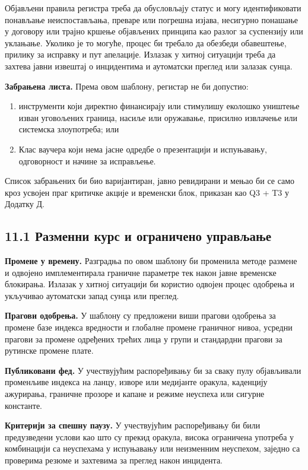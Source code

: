 \documentclass[11pt]{article}
\begin{document}
Објављени правила регистра треба да обусловљају статус и могу идентификовати понављање неиспостављања, преваре или погрешна изјава, несигурно понашање у договору или трајно кршење објављених принципа као разлог за суспензију или уклањање. Уколико је то могуће, процес би требало да обезбеди обавештење, прилику за исправку и пут апелације. Излазак у хитној ситуацији треба да захтева јавни извештај о инцидентима и аутоматски преглед или залазак сунца.

\textbf{Забрањена листа.} Према овом шаблону, регистар не би допустио:

\begin{enumerate}[leftmargin=*]
\item инструменти који директно финансирају или стимулишу еколошко уништење изван уговољених граница, насиље или оружавање, присилно извлачење или системска злоупотреба; или
\item Клас ваучера који нема јасне одредбе о презентацији и испуњавању, одговорност и начине за исправљење.
\end{enumerate}
Список забрањених би био варијантиран, јавно ревидирани и мењао би се само кроз усвојен праг критичке акције и временски блок, приказан као Q3 + T3 у Додатку Д.

\subsection*{11.1 Разменни курс и ограничено управљање}

\textbf{Промене у времену.} Разградња по овом шаблону би променила методе размене и одвојено имплементирала граничне параметре тек након јавне временске блокирања. Излазак у хитној ситуацији би користио одвојен процес одобрења и укључивао аутоматски запад сунца или преглед.

\textbf{Прагови одобрења.} У шаблону су предложени виши прагови одобрења за промене базе индекса вредности и глобалне промене граничног нивоа, усредни прагови за промене одређених трећих лица у групи и стандардни прагови за рутинске промене плате.

\textbf{Публиковани фед.} У учествујућим распоређивању би за сваку пулу објављивали променљиве индекса на ланцу, изворе или медијанте оракула, каденцију ажурирања, граничне прозоре и капане и режиме неуспеха или сигурне константе.

\textbf{Критерији за спешну паузу.} У учествујућим распоређивању би били предузведени услови као што су прекид оракула, висока ограничена употреба у комбинацији са неуспехама у испуњавању или неизменним неуспехом, заједно са проверима резюме и захтевима за преглед након инцидента.
\end{document}
